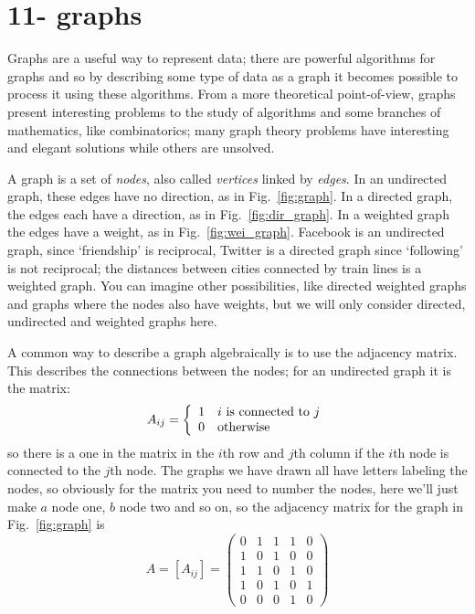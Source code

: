 \documentclass[11pt,a4paper]{scrartcl}
\begin{document}
\section*{11- graphs}

Graphs are a useful way to represent data; there are powerful
algorithms for graphs and so by describing some type of data as a
graph it becomes possible to process it using these algorithms. From a
more theoretical point-of-view, graphs present interesting problems to
the study of algorithms and some branches of mathematics, like
combinatorics; many graph theory problems have interesting and elegant
solutions while others are unsolved.

A graph is a set of \textsl{nodes}, also called \textsl{vertices}
linked by \textsl{edges}. In an undirected graph, these edges have no
direction, as in Fig.~\ref{fig:graph}. In a directed graph, the edges
each have a direction, as in Fig.~\ref{fig:dir_graph}. In a weighted
graph the edges have a weight, as in
Fig.~\ref{fig:wei_graph}. Facebook is an undirected graph, since
\lq{}friendship\rq{} is reciprocal, Twitter is a directed graph since
\lq{}following\rq{} is not reciprocal; the distances between cities
connected by train lines is a weighted graph. You can imagine other
possibilities, like directed weighted graphs and graphs where the
nodes also have weights, but we will only consider directed,
undirected and weighted graphs here.

A common way to describe a graph algebraically is to use the adjacency
matrix. This describes the connections between the nodes; for an
undirected graph it is the matrix:
\begin{equation}
A_{ij}=\left\{\begin{array}{cl}1&i\mbox{ is connected to }j\cr0&\mbox{otherwise}
\end{array}\right.
\end{equation}
so there is a one in the matrix in the $i$th row and $j$th column if
the $i$th node is connected to the $j$th node. The graphs we have
drawn all have letters labeling the nodes, so obviously for the matrix
you need to number the nodes, here we'll just make $a$ node one, $b$
node two and so on, so the adjacency matrix for the graph in
Fig.~\ref{fig:graph} is
\begin{equation}
A=[A_{ij}]=\left(
\begin{array}{ccccc}
0&1&1&1&0\\
1&0&1&0&0\\
1&1&0&1&0\\
1&0&1&0&1\\
0&0&0&1&0
\end{array}
\right)
\end{equation}
\end{document}
